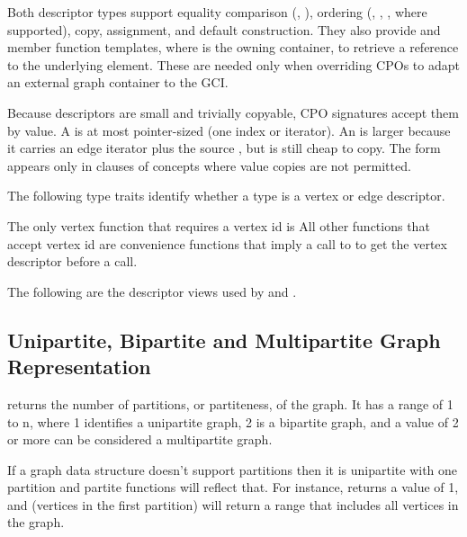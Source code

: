 Both descriptor types support equality comparison (\tcode{==}, \tcode{!=}), ordering
(\tcode{<}, \tcode{<=}, \tcode{>}, \tcode{>=} where supported), copy, assignment, and
default construction. They also provide  and
 member function templates, where  is the owning
container, to retrieve a reference to the underlying element. These are needed only
when overriding CPOs to adapt an external graph container to the GCI.

Because descriptors are small and trivially copyable, CPO signatures accept them by
value. A  is at most pointer-sized (one index or iterator).
An  is larger because it carries an edge iterator plus the source
, but is still cheap to copy. The  form appears
only in  clauses of concepts where value copies are not permitted.
{\small
      
}

The following type traits identify whether a type is a vertex or edge descriptor.
{\small
      
}

The only vertex function that requires a vertex id  is  All other functions
that accept vertex id are convenience functions that imply a call to  to get the vertex 
descriptor before a call.

The following are the descriptor views used by  and .
{\small
      
}

\subsection{Unipartite, Bipartite and Multipartite Graph Representation}

 returns the number of partitions, or partiteness, of the graph. It has a range of 1 to n, where 1 identifies 
a unipartite graph, 2 is a bipartite graph, and a value of 2 or more can be considered a multipartite graph. 

If a graph data structure doesn't support partitions then it is unipartite with one partition and partite functions will reflect that. 
For instance,  returns a value of 1, and  (vertices in the first partition) will return a range that includes all vertices in the graph.

